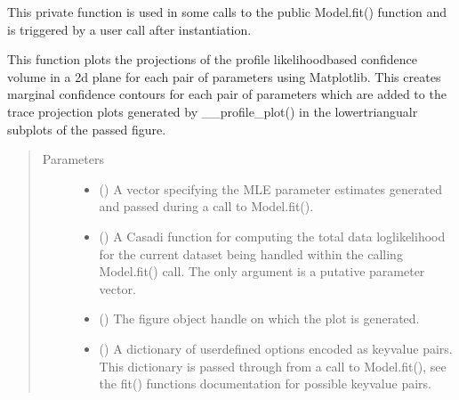 \documentclass[letterpaper,10pt,english,openany,oneside]{sphinxmanual}
\begin{document}
\begin{fulllineitems}
\begin{fulllineitems}
This private function is used in some calls to the public Model.fit() function and is
triggered by a user call after instantiation.

This function plots the projections of the profile likelihood\sphinxhyphen{}based confidence volume in a
2d plane for each pair of parameters using Matplotlib. This creates marginal confidence
contours for each pair of parameters which are added to the trace projection plots generated
by \_\_profile\_plot() in the lower\sphinxhyphen{}triangualr sub\sphinxhyphen{}plots of the passed figure.
\begin{quote}\begin{description}
\item[{Parameters}] \leavevmode\begin{itemize}
\item {} 
 (\sphinxstyleliteralemphasis{\sphinxupquote{, }}) \textendash{} A vector specifying the MLE parameter estimates generated and
passed during a call to Model.fit().

\item {} 
 () \textendash{} A Casadi function for computing the total data log\sphinxhyphen{}likelihood
for the current dataset being handled within the calling Model.fit() call. The only
argument is a putative parameter vector.

\item {} 
 () \textendash{} The figure object handle on which the plot is generated.

\item {} 
 () \textendash{} A dictionary of user\sphinxhyphen{}defined options encoded as key\sphinxhyphen{}value
pairs. This dictionary is passed through from a call to Model.fit(), see
the fit() functions documentation for possible key\sphinxhyphen{}value pairs.

\end{itemize}

\end{description}\end{quote}


\end{fulllineitems}
\end{fulllineitems}
\end{document}
